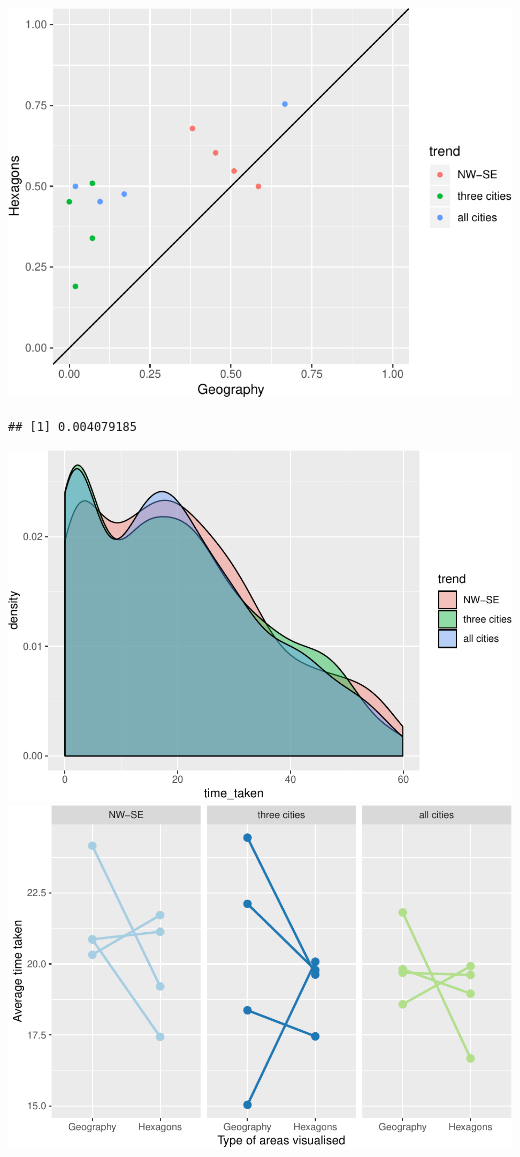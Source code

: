 \documentclass[conference,final,]{IEEEtran}
\makeatletter
\def\maxwidth{\ifdim\Gin@nat@width>\linewidth\linewidth
\else\Gin@nat@width\fi}
\let\Oldincludegraphics\includegraphics
\renewcommand{\includegraphics}[1]{\Oldincludegraphics[width=\maxwidth]{#1}}
\makeatother
\begin{document}
\includegraphics{survey_files/figure-latex/unnamed-chunk-8-1.pdf}

\begin{verbatim}
## [1] 0.004079185
\end{verbatim}

\includegraphics{survey_files/figure-latex/unnamed-chunk-9-1.pdf}
\includegraphics{survey_files/figure-latex/unnamed-chunk-9-2.pdf}
\end{document}
